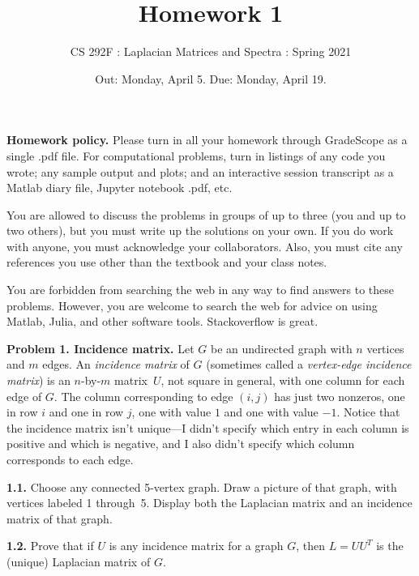 \documentclass[11pt]{article}
\begin{document}

\title{Homework 1}
\author{CS 292F : Laplacian Matrices and Spectra : Spring 2021}

\date{Out: Monday, April 5. Due: Monday, April 19.}
\maketitle

{\bf Homework policy.} 
Please turn in all your homework through GradeScope as a single .pdf file.
For computational problems, turn in listings of any code you wrote; 
any sample output and plots; and an interactive session transcript as
a Matlab diary file, Jupyter notebook .pdf, etc.

You are allowed to discuss the problems in groups of up to three 
(you and up to two others), but you must write up the solutions 
on your own. If you do work with anyone, you must acknowledge your
collaborators. Also, you must cite any references you use other than
the textbook and your class notes.

You are forbidden from searching the web in any way to find answers
to these problems. However, you are welcome to search the web for
advice on using Matlab, Julia, and other software tools. Stackoverflow
is great.
\par\bigskip

{\bf Problem 1. Incidence matrix.} 
Let $G$ be an undirected graph with $n$ vertices and $m$ edges.
An {\em incidence matrix} of $G$ (sometimes called a
{\em vertex-edge incidence matrix}) is an $n$-by-$m$ matrix~$U$,
not square in general, with one column for each edge of $G$.
The column corresponding to edge $(i,j)$ has just two nonzeros, 
one in row $i$ and one in row $j$, one with value $1$ and one 
with value $-1$.
Notice that the incidence matrix isn't unique---I didn't specify
which entry in each column is positive and which is negative,
and I also didn't specify which column corresponds to each edge.

\par\bigskip
{\bf 1.1.} 
Choose any connected 5-vertex graph.  
Draw a picture of that graph, with vertices labeled 1 through~5.
Display both the Laplacian matrix and an incidence matrix of that graph.

\par\bigskip
{\bf 1.2.} 
Prove that if $U$ is any incidence matrix for a graph $G$, 
then $L=UU^T$ is the (unique) Laplacian matrix of $G$.
\end{document}
